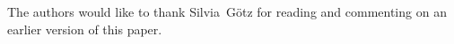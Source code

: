 \documentclass[final]{siamltex}
\newcommand{\comment}[1]{}
\newcommand{\secref}[1]{\mbox{Section~\ref{sec:#1}}}
\newcommand{\applabel}[1]{\label{app:#1}}
\newcommand{\lemref}[1]{Lemma~\ref{lem:#1}}
\begin{document}
The authors would like to thank \mbox{Silvia G\"otz} for reading and
commenting on an earlier version of this paper.




\comment{
\version{}{
\appendix

\section{Proof of \lemref{voronoi-face}}\applabel{proofs}

\noindent{\em Proof.}[Proof (of \lemref{voronoi-face})] The following
discussion uses the notation introduced in \secref{voronoi-path}. 
\qed
}
}
\end{document}
